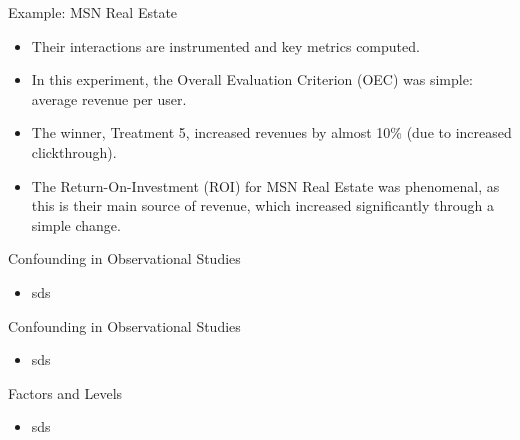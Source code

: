 \documentclass[handout]{beamer}
\begin{document}
\begin{frame}{Example: MSN Real Estate}
\scriptsize{


\begin{itemize}


 
 \item Their interactions are instrumented and key metrics computed. 
 
 \item In this experiment, the Overall Evaluation Criterion (OEC) was simple: average revenue per user.
 \item The winner, Treatment 5, increased revenues by almost 10\% (due to increased clickthrough).
 
 \item The Return-On-Investment (ROI) for MSN Real Estate was phenomenal, as this is their main source of revenue, which increased significantly through a simple change.

\end{itemize}



} 
\end{frame}




\begin{frame}{Confounding in Observational Studies }
\scriptsize{

\begin{itemize}

 \item sds
  
\end{itemize}



} 
\end{frame}

\begin{frame}{Confounding in Observational Studies}
\scriptsize{

\begin{itemize}

 \item sds
  
\end{itemize}



} 
\end{frame}


\begin{frame}{Factors and Levels}
\scriptsize{

\begin{itemize}

 \item sds
  
\end{itemize}



} 
\end{frame}
\end{document}
